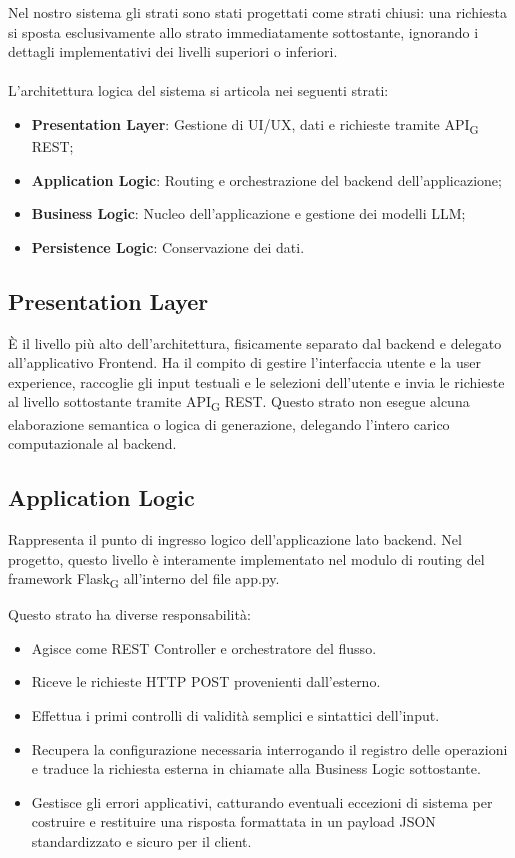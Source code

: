 \documentclass[11pt,a4paper]{article}
\newcommand{\gls}[1]{#1\textsubscript{G}}
\begin{document}
Nel nostro sistema gli strati sono stati progettati come strati chiusi: una richiesta si sposta esclusivamente allo strato immediatamente sottostante, ignorando i dettagli implementativi dei livelli superiori o inferiori.
\\ \\
L'architettura logica del sistema si articola nei seguenti strati:
\begin{itemize}
   \item \textbf{Presentation Layer}: Gestione di UI/UX, dati e richieste tramite \gls{API} REST;
   \item \textbf{Application Logic}: Routing e orchestrazione del backend dell'applicazione;
    \item \textbf{Business Logic}: Nucleo dell'applicazione e gestione dei modelli LLM;
  \item \textbf{Persistence Logic}: Conservazione dei dati.
\end{itemize}
\subsection{Presentation Layer}
È il livello più alto dell'architettura, fisicamente separato dal backend e delegato all'applicativo Frontend. Ha il compito di gestire l'interfaccia utente e la user experience, raccoglie gli input testuali e le selezioni dell'utente e invia le richieste al livello sottostante tramite \gls{API} REST. Questo strato non esegue alcuna elaborazione semantica o logica di generazione, delegando l'intero carico computazionale al backend.

\subsection{Application Logic}
Rappresenta il punto di ingresso logico dell'applicazione lato backend. Nel progetto, questo livello è interamente implementato nel modulo di routing del framework \gls{Flask} all'interno del file app.py. 

Questo strato ha diverse responsabilità:
\begin{itemize}
    \item Agisce come REST Controller e orchestratore del flusso.
    \item Riceve le richieste HTTP POST provenienti dall'esterno.
    \item Effettua i primi controlli di validità semplici e sintattici dell'input.
    \item Recupera la configurazione necessaria interrogando il registro delle operazioni e traduce la richiesta esterna in chiamate alla Business Logic sottostante.
    \item Gestisce gli errori applicativi, catturando eventuali eccezioni di sistema per costruire e restituire una risposta formattata in un payload JSON standardizzato e sicuro per il client.
\end{itemize}
\end{document}
